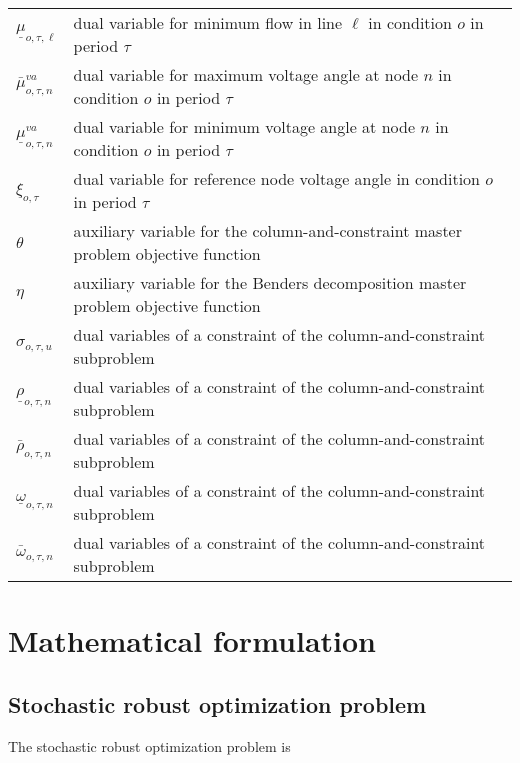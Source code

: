 \documentclass[final]{IEEEtran}
\begin{document}
\begin{supertabular}{p{1.5cm} p{6.5cm}}
	$\underline{\mu}_{o, \tau, \ell}$				& dual variable for minimum flow in line $\ell$ in condition $o$ in period $\tau$ \\
	$\bar{\mu}^{va}_{o, \tau, n}$						& dual variable for maximum voltage angle at node $n$ in condition $o$ in period $\tau$ \\
	$\underline{\mu}^{va}_{o, \tau, n}$			& dual variable for minimum voltage angle at node $n$ in condition $o$ in period $\tau$ \\
	$\xi_{o, \tau}$ 												& dual variable for reference node voltage angle in condition $o$ in period $\tau$ \\
	$\theta$																& auxiliary variable for the column-and-constraint master problem objective function \\
	$\eta$																	& auxiliary variable for the Benders decomposition master problem objective function \\
	$\sigma_{o, \tau, u}$										& dual variables of a constraint of the column-and-constraint subproblem \\
	$\underline{\rho}_{o, \tau, n}$					& dual variables of a constraint of the column-and-constraint subproblem \\
	$\bar{\rho}_{o, \tau, n}$								& dual variables of a constraint of the column-and-constraint subproblem \\
	$\underline{\omega}_{o, \tau, n}$				& dual variables of a constraint of the column-and-constraint subproblem \\
	$\bar{\omega}_{o, \tau, n}$							& dual variables of a constraint of the column-and-constraint subproblem
\end{supertabular}

\section{Mathematical formulation}
\label{section_formulation}

\subsection{Stochastic robust optimization problem}

The stochastic robust optimization problem is
\end{document}
